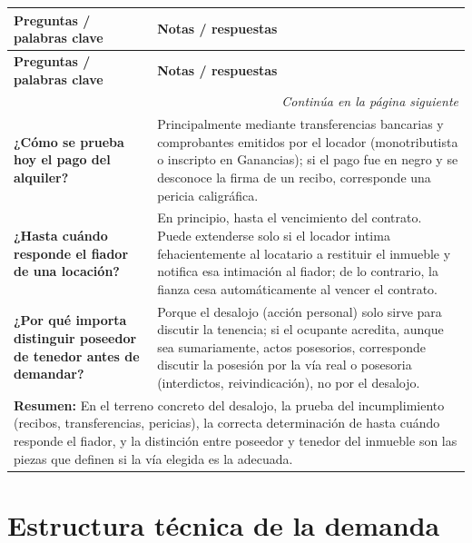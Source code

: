 \documentclass[12pt,oneside]{book}
\begin{document}
\begin{longtable}{
    p{}
    p{}
}
\toprule
\textbf{Preguntas / palabras clave} & \textbf{Notas / respuestas} \\
\midrule
\endfirsthead
\toprule
\textbf{Preguntas / palabras clave} & \textbf{Notas / respuestas} \\
\midrule
\endhead
\midrule
\multicolumn{2}{r}{\textit{Continúa en la página siguiente}} \\
\endfoot
\bottomrule
\endlastfoot

\textbf{¿Cómo se prueba hoy el pago del alquiler?} &
Principalmente mediante transferencias bancarias y comprobantes emitidos por el locador (monotributista o inscripto en Ganancias); si el pago fue en negro y se desconoce la firma de un recibo, corresponde una pericia caligráfica. \\

\textbf{¿Hasta cuándo responde el fiador de una locación?} &
En principio, hasta el vencimiento del contrato. Puede extenderse solo si el locador intima fehacientemente al locatario a restituir el inmueble y notifica esa intimación al fiador; de lo contrario, la fianza cesa automáticamente al vencer el contrato. \\

\textbf{¿Por qué importa distinguir poseedor de tenedor antes de demandar?} &
Porque el desalojo (acción personal) solo sirve para discutir la tenencia; si el ocupante acredita, aunque sea sumariamente, actos posesorios, corresponde discutir la posesión por la vía real o posesoria (interdictos, reivindicación), no por el desalojo. \\

\midrule
\multicolumn{2}{p{\dimexpr\textwidth-2\tabcolsep\relax}}{
\textbf{Resumen:} En el terreno concreto del desalojo, la prueba del incumplimiento (recibos, transferencias, pericias), la correcta determinación de hasta cuándo responde el fiador, y la distinción entre poseedor y tenedor del inmueble son las piezas que definen si la vía elegida es la adecuada.
} \\

\end{longtable}

\chapter[Estructura técnica de la demanda]{Estructura técnica de la demanda}
\label{ch:estructura}
\end{document}
